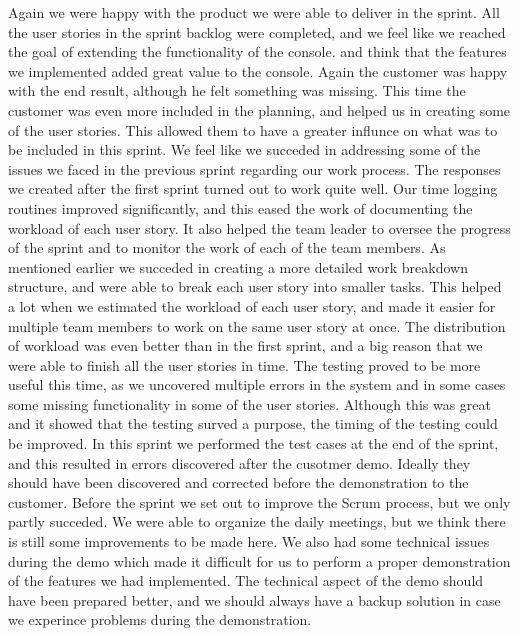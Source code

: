 Again we were happy with the product we were able to deliver in the sprint. All the user stories in the sprint backlog were completed, and we feel like we reached the goal of extending the functionality of the console. and think that the features we implemented added great value to the console. Again the customer was happy with the end result, although he felt something was missing. This time the customer was even more included in the planning, and helped us in creating some of the user stories. This allowed them to have a greater influnce on what was to be included in this sprint.
\newline
\newline
We feel like we succeded in addressing some of the issues we faced in the previous sprint regarding our work process. The responses we created after the first sprint turned out to work quite well. Our time logging routines improved significantly, and this eased the work of documenting the workload of each user story. It also helped the team leader to oversee the progress of the sprint and to monitor the work of each of the team members.
\newline
\newline
As mentioned earlier we succeded in creating a more detailed work breakdown structure, and were able to break each user story into smaller tasks. This helped a lot when we estimated the workload of each user story, and made it easier for multiple team members to work on the same user story at once. The distribution of workload was even better than in the first sprint, and a big reason that we were able to finish all the user stories in time.
\newline
\newline
The testing proved to be more useful this time, as we uncovered multiple errors in the system and in some cases some missing functionality in some of the user stories. Although this was great and it showed that the testing surved a purpose, the timing of the testing could be improved. In this sprint we performed the test cases at the end of the sprint, and this resulted in errors discovered after the cusotmer demo. Ideally they should have been discovered and corrected before the demonstration to the customer.
\newline
\newline
Before the sprint we set out to improve the Scrum process, but we only partly succeded. We were able to organize the daily meetings, but we think there is still some improvements to be made here. We also had some technical issues during the demo which made it difficult for us to perform a proper demonstration of the features we had implemented. The technical aspect of the demo should have been prepared better, and we should always have a backup solution in case we experince problems during the demonstration.
